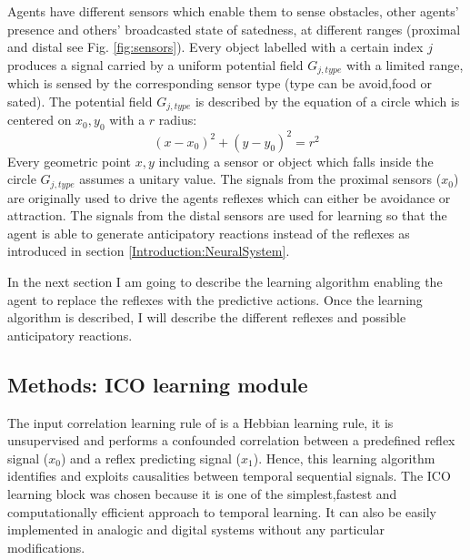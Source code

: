 Agents have different sensors which enable them to sense
obstacles, other agents' presence and others' broadcasted state of satedness, at
different ranges (proximal and distal see Fig. \ref{fig:sensors}).
Every object labelled with a certain index $j$ produces a signal carried by a
uniform potential field $G_{j,type}$ with a limited range, which is sensed
by the corresponding sensor type (type can be avoid,food or sated).
The potential field $G_{j,type}$ is described by the equation of a circle which is centered
on $x_0,y_0$ with a $r$ radius:
\begin{equation}
(x-x_0)^2+(y-y_0)^2=r^2 \label{eq:circle}
\end{equation}
Every geometric point $x,y$ including a sensor or object which falls inside 
the circle $G_{j,type}$ assumes a unitary value.
The signals from the proximal sensors ($x_{0}$) are originally used to drive
the agents reflexes which can either be avoidance or attraction. The signals
from the distal sensors are used for learning so that the agent is able to
generate anticipatory reactions instead of the reflexes as introduced in section \ref{Introduction:NeuralSystem}.

In the next section I am going to describe the learning algorithm enabling the agent to
replace the reflexes with the predictive actions.
Once the learning algorithm is described, I will describe the different reflexes and possible
anticipatory reactions.
\subsection{Methods: ICO learning module \label{Section:ICOlearning}}

The input correlation learning rule of \citet{Porr2006ICO} is a Hebbian learning rule,
it is unsupervised and performs a confounded correlation between a predefined reflex signal
($x_{0}$) and a reflex predicting signal ($x_{1}$). Hence, this learning
algorithm identifies and exploits causalities between temporal
sequential signals.
The ICO learning block was chosen because it is one of the simplest,fastest and computationally 
efficient approach to temporal learning.
It can also be easily implemented in analogic and digital systems without any
 particular modifications.

